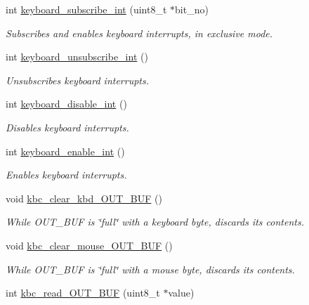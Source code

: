 \begin{DoxyCompactItemize}
\item 
int \mbox{\hyperlink{group__keyboard_ga8eee4d0a15beada731a514481b5ad4bf}{keyboard\+\_\+subscribe\+\_\+int}} (uint8\+\_\+t $\ast$bit\+\_\+no)
\begin{DoxyCompactList}\small\item\em Subscribes and enables keyboard interrupts, in exclusive mode. \end{DoxyCompactList}\item 
int \mbox{\hyperlink{group__keyboard_gac95aea27a5e91b363b876fed881f368f}{keyboard\+\_\+unsubscribe\+\_\+int}} ()
\begin{DoxyCompactList}\small\item\em Unsubscribes keyboard interrupts. \end{DoxyCompactList}\item 
int \mbox{\hyperlink{group__keyboard_ga6d0b21990c1bc497f6986367d485af52}{keyboard\+\_\+disable\+\_\+int}} ()
\begin{DoxyCompactList}\small\item\em Disables keyboard interrupts. \end{DoxyCompactList}\item 
int \mbox{\hyperlink{group__keyboard_gaeb94e69ca92a37bc52ec381aa3ea5c70}{keyboard\+\_\+enable\+\_\+int}} ()
\begin{DoxyCompactList}\small\item\em Enables keyboard interrupts. \end{DoxyCompactList}\item 
void \mbox{\hyperlink{group__keyboard_gaf87a23192c923b92891892df893963b7}{kbc\+\_\+clear\+\_\+kbd\+\_\+\+O\+U\+T\+\_\+\+B\+UF}} ()
\begin{DoxyCompactList}\small\item\em While O\+U\+T\+\_\+\+B\+UF is \char`\"{}full\char`\"{} with a keyboard byte, discards its contents. \end{DoxyCompactList}\item 
void \mbox{\hyperlink{group__keyboard_ga3c87ba94c8bab09066553ba6d89c07c8}{kbc\+\_\+clear\+\_\+mouse\+\_\+\+O\+U\+T\+\_\+\+B\+UF}} ()
\begin{DoxyCompactList}\small\item\em While O\+U\+T\+\_\+\+B\+UF is \char`\"{}full\char`\"{} with a mouse byte, discards its contents. \end{DoxyCompactList}\item 
int \mbox{\hyperlink{group__keyboard_ga870b444bcf2b470834d2027dc30bb46e}{kbc\+\_\+read\+\_\+\+O\+U\+T\+\_\+\+B\+UF}} (uint8\+\_\+t $\ast$value)

\end{DoxyCompactItemize}
